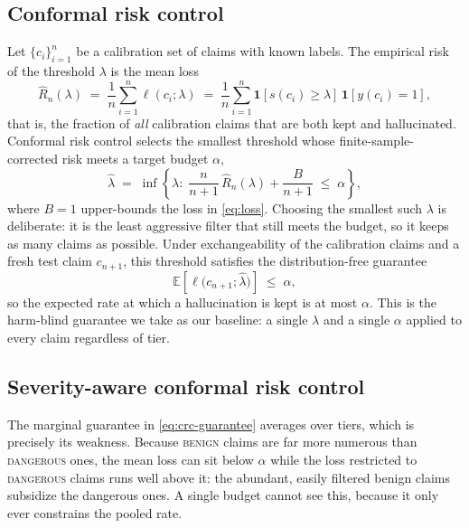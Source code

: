 \documentclass[11pt]{article}
\begin{document}
\subsection{Conformal risk control}
\label{sec:crc}
Let $\{c_i\}_{i=1}^{n}$ be a calibration set of claims with known labels. The
empirical risk of the threshold $\lambda$ is the mean loss
\begin{equation}
\widehat{R}_n(\lambda) \;=\; \frac{1}{n} \sum_{i=1}^{n} \ell(c_i; \lambda)
\;=\; \frac{1}{n} \sum_{i=1}^{n}
\mathbf{1}\!\left[s(c_i) \ge \lambda\right]\,\mathbf{1}\!\left[y(c_i) = 1\right],
\label{eq:emp-risk}
\end{equation}
that is, the fraction of \emph{all} calibration claims that are both kept and
hallucinated. Conformal risk control \citep{angelopoulos2024crc} selects the
smallest threshold whose finite-sample-corrected risk meets a target budget
$\alpha$,
\begin{equation}
\widehat{\lambda} \;=\; \inf\left\{ \lambda :\;
\frac{n}{n+1}\,\widehat{R}_n(\lambda) + \frac{B}{n+1} \;\le\; \alpha \right\},
\label{eq:crc-threshold}
\end{equation}
where $B = 1$ upper-bounds the loss in \eqref{eq:loss}. Choosing the smallest such
$\lambda$ is deliberate: it is the least aggressive filter that still meets the
budget, so it keeps as many claims as possible. Under exchangeability of the
calibration claims and a fresh test claim $c_{n+1}$, this threshold satisfies the
distribution-free guarantee
\begin{equation}
\mathbb{E}\!\left[\ell\big(c_{n+1}; \widehat{\lambda}\big)\right] \;\le\; \alpha,
\label{eq:crc-guarantee}
\end{equation}
so the expected rate at which a hallucination is kept is at most $\alpha$. This is
the harm-blind guarantee we take as our baseline: a single $\lambda$ and a single
$\alpha$ applied to every claim regardless of tier.

\subsection{Severity-aware conformal risk control}
\label{sec:sac}
The marginal guarantee in \eqref{eq:crc-guarantee} averages over tiers, which is
precisely its weakness. Because \textsc{benign} claims are far more numerous than
\textsc{dangerous} ones, the mean loss can sit below $\alpha$ while the loss
restricted to \textsc{dangerous} claims runs well above it: the abundant, easily
filtered benign claims subsidize the dangerous ones. A single budget cannot see
this, because it only ever constrains the pooled rate.
\end{document}
